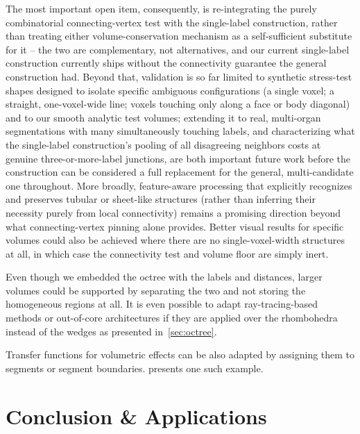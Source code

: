 \documentclass[journal]{vgtc}                     %
\begin{document}
The most important open item, consequently, is re-integrating the purely combinatorial connecting-vertex test with the single-label construction, rather than treating either volume-conservation mechanism as a self-sufficient substitute for it -- the two are complementary, not alternatives, and our current single-label construction currently ships without the connectivity guarantee the general construction had. Beyond that, validation is so far limited to synthetic stress-test shapes designed to isolate specific ambiguous configurations (a single voxel; a straight, one-voxel-wide line; voxels touching only along a face or body diagonal) and to our smooth analytic test volumes; extending it to real, multi-organ segmentations with many simultaneously touching labels, and characterizing what the single-label construction's pooling of all disagreeing neighbors costs at genuine three-or-more-label junctions, are both important future work before the construction can be considered a full replacement for the general, multi-candidate one throughout. More broadly, feature-aware processing that explicitly recognizes and preserves tubular or sheet-like structures (rather than inferring their necessity purely from local connectivity) remains a promising direction beyond what connecting-vertex pinning alone provides. Better visual results for specific volumes could also be achieved where there are no single-voxel-width structures at all, in which case the connectivity test and volume floor are simply inert.

Even though we embedded the octree with the labels and distances, larger volumes could be supported by separating the two and not storing the homogeneous regions at all. It is even possible to adapt ray-tracing-based methods or out-of-core architectures if they are applied over the rhombohedra instead of the wedges as presented in~\cref{sec:octree}.

Transfer functions for volumetric effects can be also adapted by assigning them to segments or segment boundaries.  presents one such example.



\section{Conclusion \& Applications}
\end{document}
